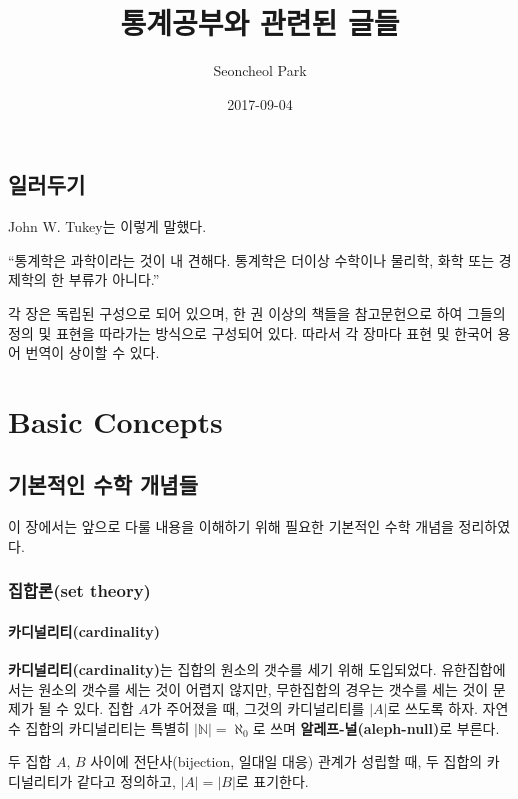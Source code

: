 \documentclass[b5paper,]{scrbook}
\title{통계공부와 관련된 글들}
\author{Seoncheol Park}
\date{2017-09-04}
\theoremstyle{plain}
\theoremstyle{definition}
\numberwithin{equation}{section}
\let\BeginKnitrBlock\begin \let\EndKnitrBlock\end
\begin{document}
\maketitle

{
\hypersetup{linkcolor=Black}
\setcounter{tocdepth}{2}
\tableofcontents
}
\chapter{일러두기}

John W. Tukey는 이렇게 말했다.

``통계학은 과학이라는 것이 내 견해다. 통계학은 더이상 수학이나 물리학,
화학 또는 경제학의 한 부류가 아니다.''

각 장은 독립된 구성으로 되어 있으며, 한 권 이상의 책들을 참고문헌으로
하여 그들의 정의 및 표현을 따라가는 방식으로 구성되어 있다. 따라서 각
장마다 표현 및 한국어 용어 번역이 상이할 수 있다.

\mainmatter

\part{Basic Concepts}\label{part-basic-concepts}

\chapter{기본적인 수학 개념들}\label{math}

이 장에서는 앞으로 다룰 내용을 이해하기 위해 필요한 기본적인 수학 개념을
정리하였다.

\section{집합론(set theory)}\label{set-theory}

\subsection{카디널리티(cardinality)}\label{cardinality}

\textbf{카디널리티(cardinality)}는 집합의 원소의 갯수를 세기 위해
도입되었다. 유한집합에서는 원소의 갯수를 세는 것이 어렵지 않지만,
무한집합의 경우는 갯수를 세는 것이 문제가 될 수 있다. 집합 \(A\)가
주어졌을 때, 그것의 카디널리티를 \(|A|\)로 쓰도록 하자. 자연수 집합의
카디널리티는 특별히 \(|\mathbb{N}|=\aleph_{0}\)로 쓰며
\textbf{알레프-널(aleph-null)}로 부른다.

\BeginKnitrBlock{definition}[카디널리티가 같다]
\protect\hypertarget{def:unnamed-chunk-1}{}{\label{def:unnamed-chunk-1}
{} }두 집합 \(A\), \(B\) 사이에
전단사(bijection, 일대일 대응) 관계가 성립할 때, 두 집합의 카디널리티가
같다고 정의하고, \(|A|=|B|\)로 표기한다.
\EndKnitrBlock{definition}
\end{document}
